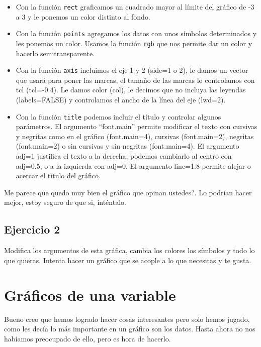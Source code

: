 \documentclass[]{article}
\begin{document}
\begin{itemize}
\item
  Con la función \texttt{rect} graficamos un cuadrado mayor al límite
  del gráfico de -3 a 3 y le ponemos un color distinto al fondo.
\item
  Con la función \texttt{points} agregamos los datos con unos símbolos
  determinados y les ponemos un color. Usamos la función \texttt{rgb}
  que nos permite dar un color y hacerlo semitransparente.
\item
  Con la función \texttt{axis} incluimos el eje 1 y 2 (side=1 o 2), le
  damos un vector que usará para poner las marcas, el tamaño de las
  marcas lo controlamos con tcl (tcl=-0.4). Le damos color (col), le
  decimos que no incluya las leyendas (labels=FALSE) y controlamos el
  ancho de la línea del eje (lwd=2).
\item
  Con la función \texttt{title} podemos incluir el título y controlar
  algunos parámetros. El argumento ``font.main'' permite modificar el
  texto con cursivas y negritas como en el gráfico (font.main=4),
  cursivas (font.main=2), negritas (font.main=2) o sin cursivas y sin
  negritas (font.main=4). El argumento adj=1 justifica el texto a la
  derecha, podemos cambiarlo al centro con adj=0.5, o a la izquierda con
  adj=0. El argumento line=1.8 permite alejar o acercar el título del
  gráfico.
\end{itemize}

Me parece que quedo muy bien el gráfico que opinan ustedes?. Lo podrían
hacer mejor, estoy seguro de que si, inténtalo.

\subsection{Ejercicio 2}\label{ejercicio-2}

Modifica los argumentos de esta gráfica, cambia los colores los símbolos
y todo lo que quieras. Intenta hacer un gráfico que se acople a lo que
necesitas y te gusta.

\section{Gráficos de una variable}\label{graficos-de-una-variable}

Bueno creo que hemos logrado hacer cosas interesantes pero solo hemos
jugado, como les decía lo más importante en un gráfico son los datos.
Hasta ahora no nos habíamos preocupado de ello, pero es hora de hacerlo.
\end{document}
